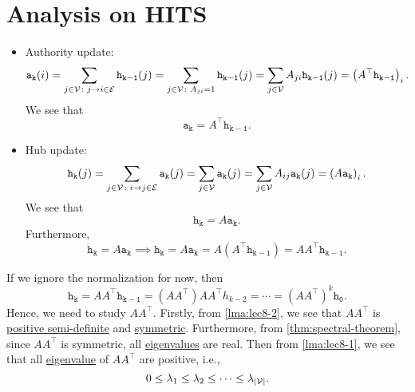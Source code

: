 \section{Analysis on HITS}
\begin{itemize}
	\item Authority update:
	      \[
		      \mathtt{a_k(\mathnormal{i})}  = \sum\limits_{j\in \mathcal{V}\colon j\to i\in \mathcal{E}}\mathtt{h_{k-1}(\mathnormal{j})}
		      =\sum\limits_{j\in\mathcal{V}\colon A_{ji} = 1}\mathtt{h_{k-1}(\mathnormal{j})}
		      =\sum\limits_{j\in\mathcal{V}}A_{ji}\mathtt{h_{k-1}(\mathnormal{j})}
		      = \left(A^{\top} \mathtt{h_{k-1}}\right)_i.
	      \]
	      We see that
	      \[
		      \mathtt{a_k} = A^{\top}\mathtt{h_{k-1}}.
	      \]
	\item Hub update:
	      \[
		      \mathtt{h_k(\mathnormal{j})} = \sum\limits_{j\in\mathcal{V}\colon i\to j\in\mathcal{E}} \mathtt{a_k(\mathnormal{j})}
		      = \sum\limits_{j\in\mathcal{V}} \mathtt{a_k(\mathnormal{j})}
		      = \sum\limits_{j\in\mathcal{V} }A_{ij}\mathtt{a_k(\mathnormal{j})}
		      = \left(A\mathtt{a_k}\right)_i.
	      \]
	      We see that
	      \[
		      \mathtt{h_{k}} = A \mathtt{a_{k}}.
	      \]
	      Furthermore,
	      \[
		      \mathtt{h_k} = A\mathtt{a_k}\implies \mathtt{h_k}= A\mathtt{a_k} = A(A^{\top}\mathtt{h_{k-1}}) = A A^{\top} \mathtt{h_{k-1}}.
	      \]
\end{itemize}
If we ignore the normalization for now, then
\[
	\mathtt{h_k} = A A^{\top}\mathtt{h_{k-1}} = (A A^{\top})A A^{\top} h_{k-2} = \cdots = (A A^{\top})^k \mathtt{h_0}.
\]
Hence, we need to study \(A A^{\top}\). Firstly, from \autoref{lma:lec8-2}, we see that \(A A^{\top} \) is \hyperref[def:positive-semi-definite]{positive semi-definite}
and \hyperref[def:symmetric-matrix]{symmetric}. Furthermore, from \autoref{thm:spectral-theorem}, since \(A A^{\top} \) is symmetric, all \hyperref[def:eigenvalue]{eigenvalues} are real. Then
from \autoref{lma:lec8-1}, we see that all \hyperref[def:eigenvalue]{eigenvalue} of \(A A^{\top} \) are positive, i.e.,
\[
	0 \leq \lambda_1 \leq \lambda_2 \leq \cdots \leq \lambda_{\left\vert \mathcal{\MakeUppercase{v}} \right\vert } .
\]

